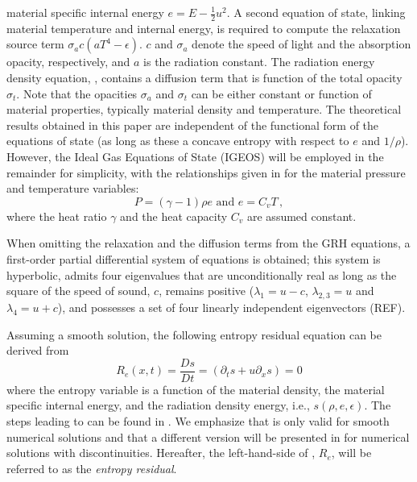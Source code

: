 \documentclass[times,doublespace]{fldauth}%
\begin{document}
material specific internal energy $e = E - \tfrac 1 2 u^2$. A second equation of state, linking material temperature 
and internal energy, is required to compute the relaxation source term $\sigma_a c \left( a T^4 - \epsilon \right)$.
$c$ and $\sigma_a$ denote the speed of light and the absorption opacity, respectively, and $a$ is the radiation 
constant. The radiation energy density equation, , contains a diffusion term that is function of the 
total opacity $\sigma_t$. Note that the opacities $\sigma_a$ and $\sigma_t$ can be either constant or function of 
material properties, typically material density and temperature. 
The theoretical results obtained in this paper are independent of the functional form of the equations of state 
(as long as these a concave entropy with respect to $e$ and $1/ \rho$). However, the Ideal Gas Equations of State
(IGEOS) will be employed in the remainder for simplicity, with the relationships given in  for the material pressure and temperature variables:
%
\begin{equation}\label{eq:IGEOS}
P = (\gamma-1) \rho e \text{  and  } e = C_v T \, ,
\end{equation}
%
where the heat ratio $\gamma$ and the heat capacity $C_v$ are assumed constant.

When omitting the relaxation and the diffusion terms from the GRH equations, a first-order partial differential system 
of equations is obtained; this system is hyperbolic, admits four eigenvalues that are unconditionally real as long as the square of the speed of sound, $c$, remains positive ($\lambda_1 = u - c$, $\lambda_{2,3} = u$ and  $\lambda_4 = u + c$), and possesses a set of four linearly independent eigenvectors (REF).  

Assuming a smooth solution, the following entropy residual equation can be derived from 
%
\begin{equation}\label{eq:GRH-entropy}
R_e(x,t) = \frac{D s}{Dt} = \left( \partial_t s + u \partial_x s \right) = 0
\end{equation}
%
where the entropy variable is a function of the material density, the material specific internal energy, 
and the radiation density energy, i.e., $s(\rho, e, \epsilon)$. The steps leading to  
can be found in \cite{our_jcp_radhy_paper}.
We emphasize that  is only valid for smooth numerical solutions and that a different version 
will be presented in  for numerical solutions with discontinuities. 
Hereafter, the left-hand-side of , $R_e$, will be referred to as the \emph{entropy residual}.
\end{document}
